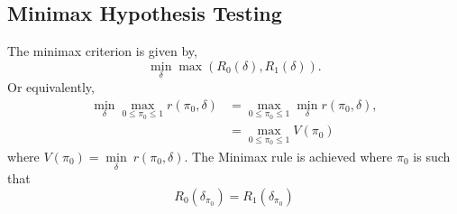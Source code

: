 \documentclass[a4paper,english,12pt]{article}
\begin{document}
\subsection{Minimax Hypothesis Testing}
The minimax criterion is given by,
\begin{equation}
\min_{\delta}\max({R_{0}(\delta),R_{1}(\delta)}).
\end{equation}
Or equivalently,
\begin{align}
\min_{\delta}\max_{0 \leq \pi_{0} \leq 1}r(\pi_{0},\delta)&= \max_{0 \leq \pi_{0} \leq 1}\min_{\delta}r(\pi_{0},\delta),\nonumber\\
&= \max_{0 \leq \pi_{0} \leq 1}V(\pi_{0})
\end{align}
where $V(\pi_{0})=\underset{\delta}{\min}~r(\pi_{0},\delta)$. The Minimax rule is achieved where $\pi_{0}$ is such that
\begin{equation} 
R_{0}(\delta_{\pi_{0}})=R_{1}(\delta_{\pi_{0}})
\end{equation}
\end{document}
